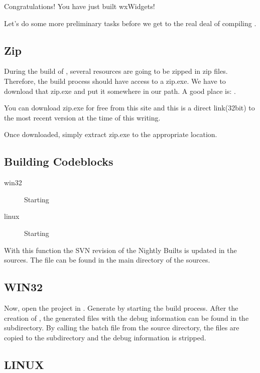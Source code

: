 Congratulations! You have just built wxWidgets!

Let's do some more preliminary tasks before we get to the real deal of compiling \codeblocks.

\subsection{Zip}

During the build of \codeblocks, several resources are going to be zipped in zip files. Therefore, the build process should have access to a zip.exe. We have to download that zip.exe and put it somewhere in our path. A good place is: .

You can download zip.exe for free from this site and this is a direct link(32bit) to the most recent version at the time of this writing.

Once downloaded, simply extract zip.exe to the appropriate location.

\subsection{Building Codeblocks}

\begin{description}
\item[win32] Starting 
\item[linux] Starting 
\end{description}

With this function the SVN revision of the Nightly Builts is updated in the sources. The file can be found in the main directory of the \codeblocks sources.

\subsection{WIN32}

Now, open the project  in \codeblocks. Generate \codeblocks by starting the build process. After the creation of \codeblocks, the generated files with the debug information can be found in the  subdirectory. By calling the batch file  from the source directory, the files are copied to the  subdirectory and the debug information is stripped.

\subsection{LINUX}

